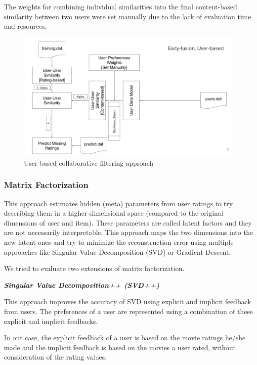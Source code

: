 \documentclass{sigish}
\begin{document}
The weights for combining individual similarities into the final content-based similarity between two users were set manually due to the lack of evaluation time and resources.

\begin{figure}
	\centering
	\includegraphics[width=\columnwidth]{images/ubcf_approach.png}
	\caption{User-based collaborative filtering approach}
	\label{fig:ubcf_approach}
\end{figure}

\subsubsection{Matrix Factorization}

This approach estimates hidden (meta) parameters from user ratings to try describing them in a higher dimensional space (compared to the original dimensions of user and item). These parameters are called latent factors and they are not necessarily interpretable. This approach maps the two dimensions into the new latent ones and try to minimize the reconstruction error using multiple approaches like Singular Value Decomposition (SVD) or Gradient Descent.

We tried to evaluate two extensions of matrix factorization.

\textbf{\emph{Singular Value Decomposition++ (SVD++) }}
\newline

This approach improves the accuracy of SVD using explicit and implicit feedback from users. The preferences of a user are represented using a combination of these explicit and implicit feedbacks.

In out case, the explicit feedback of a user is based on the movie ratings he/she made and the implicit feedback is based on the movies a user rated, without consideration of the rating values.
\end{document}
